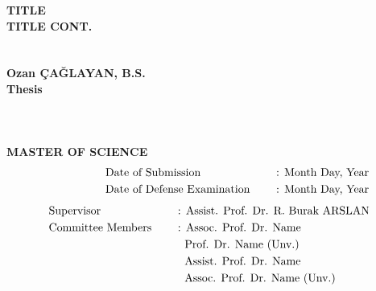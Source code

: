 \clearpage
\setcounter{page}{1}
\thispagestyle{empty}
{
\vspace*{-7.5mm}
\centering\textbf{TITLE}\\\vspace*{1.5mm}
\centering\textbf{TITLE CONT.}\\\vspace*{1.5mm}
\\\vspace*{1.5mm}
\vspace*{13mm}
\\\vspace*{1.5mm}
\centering\textbf{Ozan ÇAĞLAYAN, B.S.}\\
\vspace*{30pt}
\centering\textbf{Thesis}\\\vspace*{1.5mm}
\\\vspace*{1.5mm}
\\\vspace*{1.5mm}
\\
\vspace*{30pt}
\centering\textbf{MASTER OF SCIENCE}\\
\vspace*{10pt}
\begin{alignat*}{2}
 & \quad\quad\quad\quad\quad\text{Date of Submission \quad } && \text{: Month Day, Year} \\
 & \quad\quad\quad\quad\quad\text{Date of Defense Examination \quad } && \text{: Month Day, Year}
\end{alignat*}
\vspace*{10pt}
\begin{alignat*}{2}
 & \text{Supervisor} && \text{: Assist. Prof. Dr. R. Burak ARSLAN} \\
 & \text{Committee Members \quad } && \text{: Assoc. Prof. Dr. Name} \\
 & \text{} && \text{\; Prof. Dr. Name (Unv.)} \\
 & \text{} && \text{\; Assist. Prof. Dr. Name} \\
 & \text{} && \text{\; Assoc. Prof. Dr. Name (Unv.)}
\end{alignat*}
}